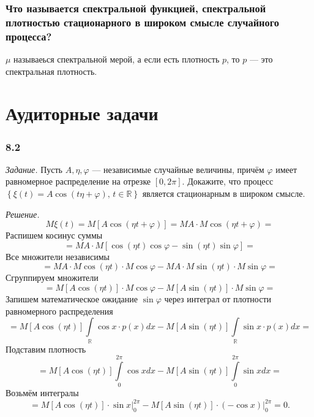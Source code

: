 \subsubsection*{Что называется спектральной функцией, спектральной плотностью стационарного в
                широком смысле случайного процесса?}

$ \mu $ называеься спектральной мерой, а если есть плотность $p$, то $p$ ---
это спектральная плотность.

\section*{Аудиторные задачи}

\subsubsection*{8.2}

\textit{Задание.}
Пусть $A, \eta, \varphi $ --- независимые случайные величины,
причём $ \varphi $ имеет равномерное распределение на отрезке $ \left[ 0, 2 \pi \right] $.
Докажите, что процесс
$ \left\{
    \xi \left( t \right) = A \cos \left( t \eta + \varphi \right), \, t \in \mathbb{R}
  \right\} $
является стационарным в широком смысле.

\textit{Решение.}
$$M \xi \left( t \right) =
  M \left[ A \cos \left( \eta t + \varphi \right) \right] =
  MA \cdot M \cos \left( \eta t + \varphi \right) =$$
Распишем косинус суммы
$$= MA \cdot M \left[
    \cos \left( \eta t \right) \cos \varphi - \sin \left( \eta t \right) \sin \varphi \right] =$$
Все множители независимы
$$= MA \cdot M \cos \left( \eta t \right) \cdot M \cos \varphi -
  MA \cdot M \sin \left( \eta t \right) \cdot M \sin \varphi =$$
Сгруппируем множители
$$= M \left[ A \cos \left( \eta t \right) \right] \cdot M \cos \varphi -
  M \left[ A \sin \left( \eta t \right) \right] \cdot M \sin \varphi =$$
Запишем математическое ожидание $ \sin \varphi $
через интеграл от плотности равномерного распределения
$$= M \left[ A \cos \left( \eta t \right) \right]
  \int \limits_{ \mathbb{R}} \cos x \cdot p \left( x \right) dx -
  M \left[ A \sin \left( \eta t \right) \right]
  \int \limits_{ \mathbb{R}} \sin x \cdot p \left( x \right) dx =$$
Подставим плотность
$$= M \left[ A \cos \left( \eta t \right) \right] \int \limits_0^{2 \pi } \cos xdx -
  M \left[ A \sin \left( \eta t \right) \right] \int \limits_0^{2 \pi } \sin xdx =$$
Возьмём интегралы
$$= M \left[ A \cos \left( \eta t \right) \right] \cdot \left. \sin x \right|_0^{2 \pi } -
  M \left[ A \sin \left( \eta t \right) \right] \cdot
  \left. \left( - \cos x \right) \right|_0^{2 \pi } =
  0.$$

